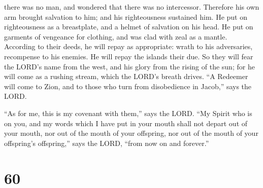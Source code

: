 there was no man, and wondered that there was no intercessor. Therefore
his own arm brought salvation to him; and his righteousness sustained
him.  He put on righteousness as a breastplate, and a
helmet of salvation on his head. He put on garments of vengeance for
clothing, and was clad with zeal as a mantle.  According to
their deeds, he will repay as appropriate: wrath to his adversaries,
recompense to his enemies. He will repay the islands their due.
 So they will fear the LORD's name from the west, and his
glory from the rising of the sun; for he will come as a rushing stream,
which the LORD's breath drives.  ``A Redeemer will come to
Zion, and to those who turn from disobedience in Jacob,'' says the LORD.

 ``As for me, this is my covenant with them,'' says the
LORD. ``My Spirit who is on you, and my words which I have put in your
mouth shall not depart out of your mouth, nor out of the mouth of your
offspring, nor out of the mouth of your offspring's offspring,'' says
the LORD, ``from now on and forever.''

\hypertarget{section-57}{%
\section{60}\label{section-57}}

